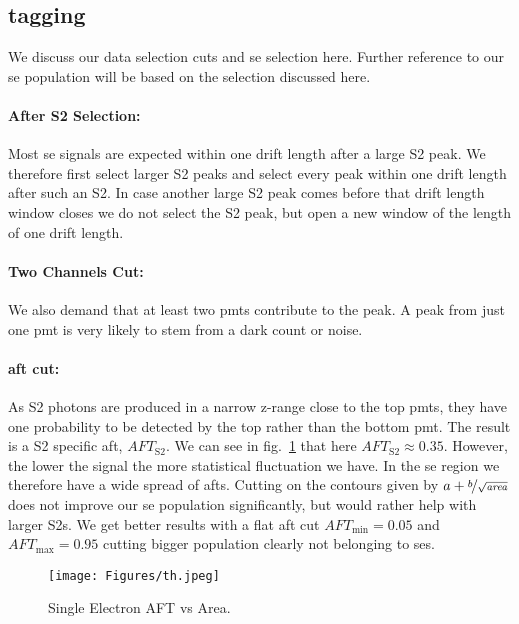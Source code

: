 
\FloatBarrier
\subsection{tagging}
\label{ssec:tagging}
\FloatBarrier


We discuss our data selection cuts and \gls{se} selection here.
Further reference to our \gls{se} population will be based on the selection discussed here.

\paragraph{After S2 Selection:} Most \gls{se} signals are expected within one drift length after a large S2 peak.
We therefore first select larger S2 peaks and select every peak within one drift length after such an S2.
In case another large S2 peak comes before that drift length window closes we do not select the S2 peak, but open a new window of the length of one drift length.

\paragraph{Two Channels Cut:} We also demand that at least two \gls{pmt}s contribute to the peak.
A peak from just one \gls{pmt} is very likely to stem from a dark count or noise.

\paragraph{\gls{aft} cut:} As S2 photons are produced in a narrow z-range close to the top \gls{pmt}s, they have one probability to be detected by the top rather than the bottom \gls{pmt}.
The result is a S2 specific \gls{aft}, $ \mathit{AFT}_\mathrm{S2} $.
We can see in fig.~\ref{fig:se-aft} that here $ \mathit{AFT}_\mathrm{S2} \approx 0.35 $.  %
However, the lower the signal the more statistical fluctuation we have.
In the \gls{se} region we therefore have a wide spread of \gls{aft}s.
Cutting on the contours given by $ a + \nicefrac{b}{\sqrt{\mathit{area}}} $ does not improve our \gls{se} population significantly, but would rather help with larger S2s.
We get better results with a flat \gls{aft} cut $ \mathit{AFT}_\mathrm{min} = 0.05 $ and $ \mathit{AFT}_\mathrm{max} = 0.95 $ cutting bigger population clearly not belonging to \gls{se}s.

\begin{figure}
    \centering
    \texttt{[image: Figures/th.jpeg]}  %
    \caption[AFT vs Area Single Electrons]{
        Single Electron AFT vs Area.
    }
    \label{fig:se-aft}
\end{figure}

